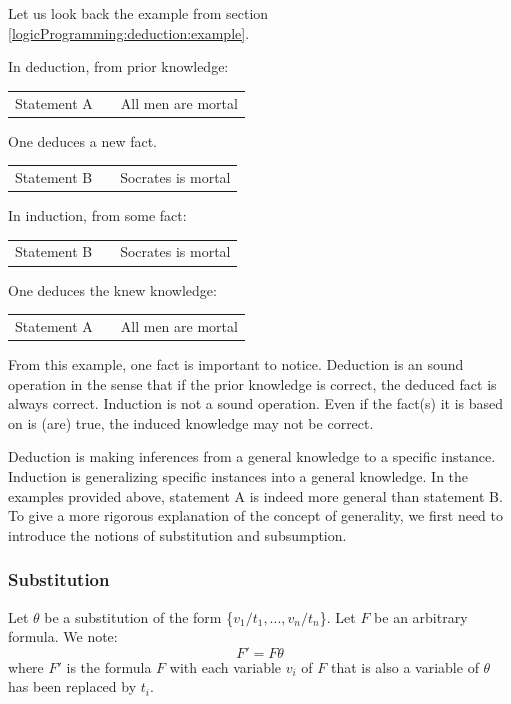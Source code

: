 \documentclass{article}
\begin{document}
Let us look back the example from section
\ref{logicProgramming:deduction:example}.

In deduction, from prior knowledge:
\begin{center}
\begin{tabular}{lll}
    Statement A & & All men are mortal \\
\end{tabular}
\end{center}
One deduces a new fact.
\begin{center}
\begin{tabular}{lll}
    Statement B & & Socrates is mortal \\
\end{tabular}
\end{center}

In induction, from some fact:
\begin{center}
\begin{tabular}{lll}
    Statement B & & Socrates is mortal \\
\end{tabular}
\end{center}
\begin{center}
One deduces the knew knowledge:
\begin{tabular}{lll}
    Statement A & & All men are mortal \\
\end{tabular}
\end{center}

From this example, one fact is important to notice.
Deduction is an sound operation in the sense that if the prior knowledge is
correct, the deduced fact is always correct. Induction is not a sound
operation. Even if the fact(s) it is based on is (are) true, the induced
knowledge may not be correct.

Deduction is making inferences from a general knowledge to a specific instance.
Induction is generalizing specific instances into a general knowledge.
In the examples provided above, statement A is indeed more general than
statement B.
To give a more rigorous explanation of the concept of generality, we first need
to introduce the notions of substitution and subsumption.

\subsubsection{Substitution} 
\label{ilp:induction:substitution}

Let $\theta$ be a substitution of the form \{$v_1/t_1, ..., v_n/t_n$\}. Let $F$
be an arbitrary formula. We note: 
$$F' = F\theta$$ 
where $F'$ is the formula $F$ with each variable $v_i$ of $F$ that is also a
variable of $\theta$ has been replaced by $t_i$.
\end{document}

